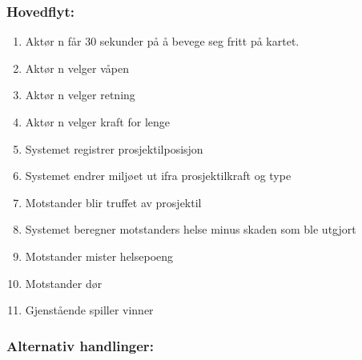 \documentclass[12pt]{report}
\begin{document}
\subsubsection*{Hovedflyt:}
\begin{enumerate}
\item Akt{\o}r n f{\aa}r 30 sekunder p{\aa} {\aa} bevege seg fritt p{\aa} kartet. 
\item Akt{\o}r n velger v{\aa}pen 
\item Akt{\o}r n velger retning 
\item Akt{\o}r n velger kraft for lenge
\item Systemet registrer prosjektilposisjon 
\item Systemet endrer milj{\o}et ut ifra prosjektilkraft og type 
\item Motstander blir truffet av prosjektil 
\item Systemet beregner motstanders helse minus skaden som ble utgjort
\item Motstander mister helsepoeng 
\item Motstander d{\o}r
\item Gjenst{\aa}ende spiller vinner
\end{enumerate}

\subsubsection*{Alternativ handlinger:}
\end{document}
